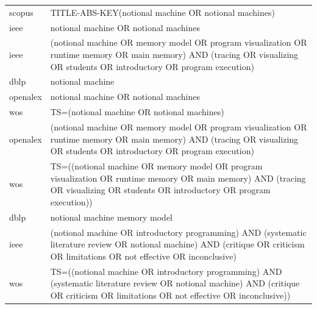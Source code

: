 \documentclass{article}
\begin{document}
\begin{longtable}{lp{10cm}}
scopus & TITLE-ABS-KEY(\textquotedbl{}notional machine\textquotedbl{} OR \textquotedbl{}notional machines\textquotedbl{}) \\
ieee & \textquotedbl{}notional machine\textquotedbl{} OR \textquotedbl{}notional machines\textquotedbl{} \\
ieee & (\textquotedbl{}notional machine\textquotedbl{} OR \textquotedbl{}memory model\textquotedbl{} OR \textquotedbl{}program visualization\textquotedbl{} OR \textquotedbl{}runtime memory\textquotedbl{} OR \textquotedbl{}main memory\textquotedbl{}) AND (tracing OR visualizing OR students OR introductory OR \textquotedbl{}program execution\textquotedbl{}) \\
dblp & notional machine \\
openalex & \textquotedbl{}notional machine\textquotedbl{} OR \textquotedbl{}notional machines\textquotedbl{} \\
wos & TS=(\textquotedbl{}notional machine\textquotedbl{} OR \textquotedbl{}notional machines\textquotedbl{}) \\
openalex & (\textquotedbl{}notional machine\textquotedbl{} OR \textquotedbl{}memory model\textquotedbl{} OR \textquotedbl{}program visualization\textquotedbl{} OR \textquotedbl{}runtime memory\textquotedbl{} OR \textquotedbl{}main memory\textquotedbl{}) AND (tracing OR visualizing OR students OR introductory OR \textquotedbl{}program execution\textquotedbl{}) \\
wos & TS=((\textquotedbl{}notional machine\textquotedbl{} OR \textquotedbl{}memory model\textquotedbl{} OR \textquotedbl{}program visualization\textquotedbl{} OR \textquotedbl{}runtime memory\textquotedbl{} OR \textquotedbl{}main memory\textquotedbl{}) AND (tracing OR visualizing OR students OR introductory OR \textquotedbl{}program execution\textquotedbl{})) \\
dblp & notional machine memory model \\
ieee & (\textquotedbl{}notional machine\textquotedbl{} OR \textquotedbl{}introductory programming\textquotedbl{}) AND (\textquotedbl{}systematic literature review\textquotedbl{} OR \textquotedbl{}notional machine\textquotedbl{}) AND (critique OR criticism OR limitations OR \textquotedbl{}not effective\textquotedbl{} OR inconclusive) \\
wos & TS=((\textquotedbl{}notional machine\textquotedbl{} OR \textquotedbl{}introductory programming\textquotedbl{}) AND (\textquotedbl{}systematic literature review\textquotedbl{} OR \textquotedbl{}notional machine\textquotedbl{}) AND (critique OR criticism OR limitations OR \textquotedbl{}not effective\textquotedbl{} OR inconclusive)) \\

\end{longtable}
\end{document}
